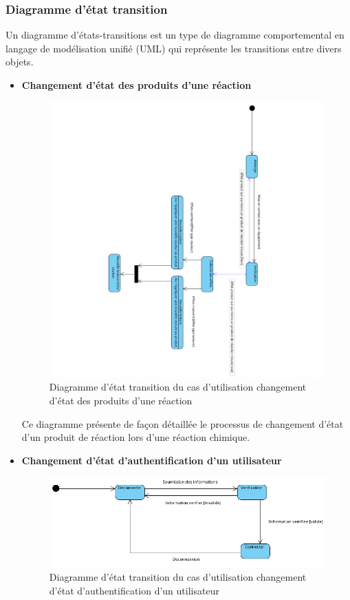 \subsubsection{Diagramme d’état transition}

Un diagramme d'états-transitions est un type de diagramme comportemental en langage de modélisation unifié (UML) qui représente les transitions entre divers objets.

\begin{itemize}
	\item \textbf{Changement d’état des produits d’une réaction}

	\begin{figure}[H]
		\centering
		\includegraphics[width=1\textwidth]{img/etdR}
		\caption{Diagramme d’état transition du cas d'utilisation changement d’état des produits d’une réaction}
		\label{fig:mesh1}
	\end{figure}

	Ce diagramme présente de façon détaillée le processus de changement d’état d’un produit de réaction lors d’une réaction chimique. 

	\item \textbf{Changement d’état d'authentification d’un utilisateur }

	\begin{figure}[H]
		\centering
		\includegraphics[width=1\textwidth]{img/etu}
		\caption{Diagramme d’état transition du cas d'utilisation changement d’état d'authentification d’un utilisateur}
		\label{fig:mesh1}
	\end{figure}


\end{itemize}
